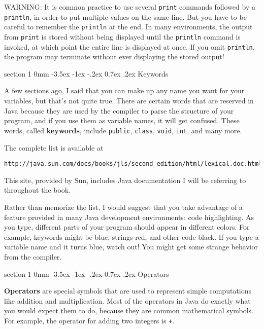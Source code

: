 \documentclass{book}
\makeatletter
\renewcommand{\section}{\@startsection 
    {section} {1} {0mm}%
    {-3.5ex \@plus -1ex \@minus -.2ex}%
    {0.7ex \@plus.2ex}%
    {\normalfont\Large\bfseries}}
\makeatother
\begin{document}
WARNING: It is common practice to use several {\tt print} commands
followed by a {\tt println}, in order to put multiple values
on the same line.  But you have to be careful to remember
the {\tt println} at the end.  In many environments, the
output from {\tt print} is stored without being displayed until
the {\tt println} command is invoked, at which point the entire
line is displayed at once.  If you omit {\tt println}, the
program may terminate without ever displaying the stored output!

\section{Keywords}

A few sections ago, I said that you can make up any name you
want for your variables, but that's not quite true.  There
are certain words that are reserved in Java because they are
used by the compiler to parse the structure of your program,
and if you use them as variable names, it will get confused.
These words, called {\bf keywords}, include {\tt public},
{\tt class}, {\tt void}, {\tt int}, and many more.

The complete list is available at

\begin{verbatim}
http://java.sun.com/docs/books/jls/second_edition/html/lexical.doc.html
\end{verbatim}
%
This site, provided by Sun, includes Java documentation I will be
referring to throughout the book.

Rather than memorize the list, I would suggest that you
take advantage of a feature provided in many Java development
environments: code highlighting.  As you type, different
parts of your program should appear in different colors.  For
example, keywords might be blue, strings red, and other code
black.  If you type a variable name and it turns blue, watch
out!  You might get some strange behavior from the compiler.

\section{Operators}

{\bf Operators} are special symbols that are used to represent
simple computations like addition and multiplication.  Most
of the operators in Java do exactly what you would expect them
to do, because they are common mathematical symbols.  For
example, the operator for adding two integers is {\tt +}.
\end{document}
